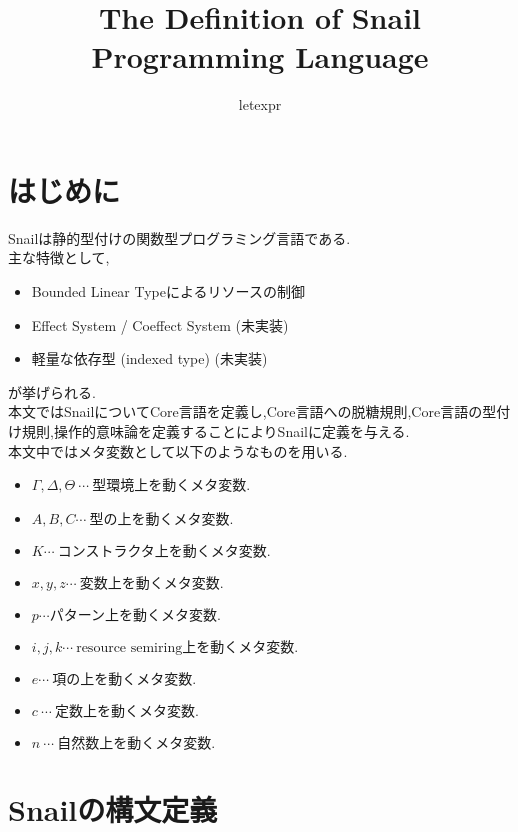 \documentclass{jsarticle}
\title{The Definition of Snail Programming Language}
\author{letexpr}
\begin{document}
\maketitle

\section{はじめに}

Snailは静的型付けの関数型プログラミング言語である.\\

主な特徴として,
\begin{itemize}
  \item Bounded Linear Typeによるリソースの制御
  \item Effect System / Coeffect System (未実装)
  \item 軽量な依存型 (indexed type) (未実装)
\end{itemize}

が挙げられる.\\

本文ではSnailについてCore言語を定義し,Core言語への脱糖規則,Core言語の型付け規則,操作的意味論を定義することによりSnailに定義を与える.\\

本文中ではメタ変数として以下のようなものを用いる.
\begin{itemize}
  \item $\Gamma , \Delta , \Theta\ \cdots\ \mbox{型環境上を動くメタ変数}$.
  \item $A,B,C \cdots\ \mbox{型の上を動くメタ変数.}$
  \item $K \cdots\ \mbox{コンストラクタ上を動くメタ変数.}$
  \item $x,y,z \cdots\ \mbox{変数上を動くメタ変数.}$
  \item $p \cdots \mbox{パターン上を動くメタ変数.}$
  \item $i,j,k \cdots\ \mbox{resource semiring上を動くメタ変数.}$
  \item $e \cdots\ \mbox{項の上を動くメタ変数.}$
  \item $c\ \cdots\ \mbox{定数上を動くメタ変数.}$
  \item $n\ \cdots\ \mbox{自然数上を動くメタ変数.}$
\end{itemize}

\newpage

\section{Snailの構文定義}
\end{document}
